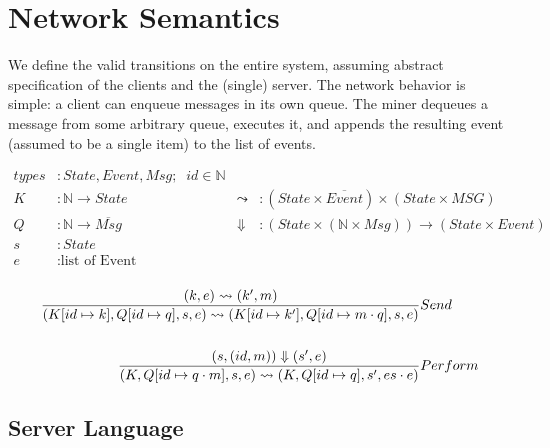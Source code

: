 \documentclass[acmsmall,review,anonymous]{acmart}\settopmatter{printfolios=true}
\begin{document}




\maketitle

\section{Network Semantics}

We define the valid transitions on the entire system, assuming abstract specification of the clients and the (single) server. The network behavior is simple: a client can enqueue messages in its own queue. The miner dequeues a message from some arbitrary queue, executes it, and appends the resulting event (assumed to be a single item) to the list of events.

\begin{align*}
types &: State, Event, Msg; \;\; id \in \mathbb{N} \\
K &: \mathbb{N} \rightarrow State \; & \leadsto &: (State \times \overline{Event}) \times (State \times MSG) \\
Q &: \mathbb{N} \rightarrow \overline{Msg} \; & \Downarrow &: (State \times (\mathbb{N} \times Msg)) \rightarrow (State \times Event) \\
s &: State \\
e &: \text{list of Event} \\
\end{align*}

\begin{align*}
\judge{&Send}{
	(k, e) \leadsto (k', m)
}{
	(K[id \mapsto k], Q[id \mapsto q], s, e) \leadsto (K[id \mapsto k'], Q[id \mapsto m \cdot q], s, e)
}
\\
\\
\judge{&Perform}{
    (s, (id, m)) \Downarrow (s', e)
}{
	(K, Q[id \mapsto q \cdot m], s, e) \leadsto (K, Q[id \mapsto q], s', es \cdot e)
}
\end{align*}

\pagebreak

\setlength{\grammarindent }{2cm}

\subsection{Server Language}
\end{document}
